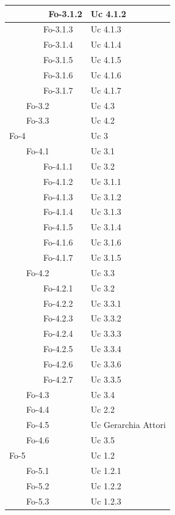 {{\begin{longtable}{|p{5cm}|p{5cm}|}
\hline
\ \ \ \ \ \ \ \ Fo-3.1.2 & Uc 4.1.2\\
\hline
\ \ \ \ \ \ \ \ Fo-3.1.3 & Uc 4.1.3\\
\hline
\ \ \ \ \ \ \ \ Fo-3.1.4 & Uc 4.1.4\\
\hline
\ \ \ \ \ \ \ \ Fo-3.1.5 & Uc 4.1.5\\
\hline
\ \ \ \ \ \ \ \ Fo-3.1.6 & Uc 4.1.6\\
\hline
\ \ \ \ \ \ \ \ Fo-3.1.7 & Uc 4.1.7\\
\hline
\ \ \ \ Fo-3.2 & Uc 4.3\\
\hline
\ \ \ \ Fo-3.3 & Uc 4.2\\
\hline
Fo-4 & Uc 3\\
\hline
\ \ \ \ Fo-4.1 & Uc 3.1\\
\hline
\ \ \ \ \ \ \ \ Fo-4.1.1 & Uc 3.2\\
\hline
\ \ \ \ \ \ \ \ Fo-4.1.2 & Uc 3.1.1\\
\hline
\ \ \ \ \ \ \ \ Fo-4.1.3 & Uc 3.1.2\\
\hline
\ \ \ \ \ \ \ \ Fo-4.1.4 & Uc 3.1.3\\
\hline
\ \ \ \ \ \ \ \ Fo-4.1.5 & Uc 3.1.4\\
\hline
\ \ \ \ \ \ \ \ Fo-4.1.6 & Uc 3.1.6\\
\hline
\ \ \ \ \ \ \ \ Fo-4.1.7 & Uc 3.1.5\\
\hline
\ \ \ \ Fo-4.2 & Uc 3.3\\
\hline
\ \ \ \ \ \ \ \ Fo-4.2.1 & Uc 3.2\\
\hline
\ \ \ \ \ \ \ \ Fo-4.2.2 & Uc 3.3.1\\
\hline
\ \ \ \ \ \ \ \ Fo-4.2.3 & Uc 3.3.2\\
\hline
\ \ \ \ \ \ \ \ Fo-4.2.4 & Uc 3.3.3\\
\hline
\ \ \ \ \ \ \ \ Fo-4.2.5 & Uc 3.3.4\\
\hline
\ \ \ \ \ \ \ \ Fo-4.2.6 & Uc 3.3.6\\
\hline
\ \ \ \ \ \ \ \ Fo-4.2.7 & Uc 3.3.5\\
\hline
\ \ \ \ Fo-4.3 & Uc 3.4\\
\hline
\ \ \ \ Fo-4.4 & Uc 2.2\\
\hline
\ \ \ \ Fo-4.5 & Uc Gerarchia Attori\\
\hline
\ \ \ \ Fo-4.6 & Uc 3.5\\
\hline
Fo-5 & Uc 1.2\\
\hline
\ \ \ \ Fo-5.1 & Uc 1.2.1\\
\hline
\ \ \ \ Fo-5.2 & Uc 1.2.2\\
\hline
\ \ \ \ Fo-5.3 & Uc 1.2.3\\

\end{longtable}}}
